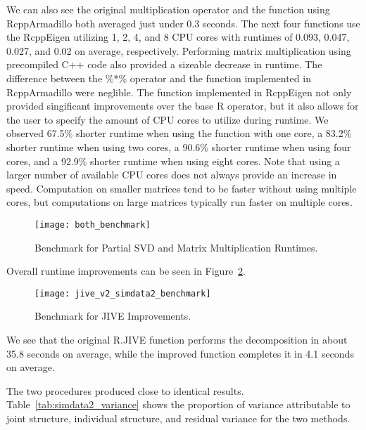 \documentclass[
12pt, %
letterpaper, %
oneside, %
headinclude,footinclude, %
BCOR5mm, %
]{scrartcl}
\begin{document}
We can also see the original multiplication operator and the function using RcppArmadillo both averaged just under 0.3 seconds. The next four functions use the RcppEigen utilizing 1, 2, 4, and 8 CPU cores with runtimes of 0.093, 0.047, 0.027, and 0.02 on average, respectively. Performing matrix multiplication using precompiled C++ code also provided a sizeable decrease in runtime. The difference between the \%*\% operator and the function implemented in RcppArmadillo were neglible. The function implemented in RcppEigen not only provided singificant improvements over the base R operator, but it also allows for the user to specify the amount of CPU cores to utilize during runtime. We observed 67.5\% shorter runtime when using the function with one core, a 83.2\% shorter runtime when using two cores, a 90.6\% shorter runtime when using four cores, and a 92.9\% shorter runtime when using eight cores. Note that using a larger number of available CPU cores does not always provide an increase in speed. Computation on smaller matrices tend to be faster without using multiple cores, but computations on large matrices typically run faster on multiple cores.

\begin{figure}[H]
    \centering 
    \texttt{[image: both\_benchmark]} 
    \caption[Benchmark for Partial SVD and Matrix Multiplication Runtimes.]{Benchmark for Partial SVD and Matrix Multiplication Runtimes.}
    \label{fig:both_benchmark} 
\end{figure}

Overall runtime improvements can be seen in Figure~\ref{fig:jive_v2_simdata2_benchmark}.

\begin{figure}[H]
    \centering 
    \texttt{[image: jive\_v2\_simdata2\_benchmark]} 
    \caption[Benchmark for JIVE Improvements]{Benchmark for JIVE Improvements.}
    \label{fig:jive_v2_simdata2_benchmark} 
\end{figure}

We see that the original R.JIVE function performs the decomposition in about 35.8 seconds on average, while the improved function completes it in 4.1 seconds on average.

The two procedures produced close to identical results. Table~\ref{tab:simdata2_variance} shows the proportion of variance attributable to joint structure, individual structure, and residual variance for the two methods.
\end{document}
